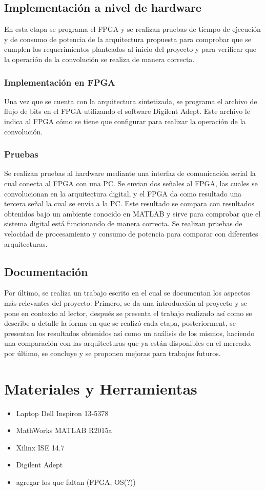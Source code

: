 \subsection{Implementación a nivel de hardware}
En esta etapa se programa el FPGA y se realizan pruebas de tiempo de ejecución y de consumo de potencia de la arquitectura propuesta para comprobar que se cumplen los requerimientos planteados al inicio del proyecto y para verificar que la operación de la convolución se realiza de manera correcta. 

\subsubsection{Implementación en FPGA}
Una vez que se cuenta con la arquitectura sintetizada, se programa el archivo de flujo de bits en el FPGA utilizando el software Digilent Adept. Este archivo le indica al FPGA cómo se tiene que configurar para realizar la operación de la convolución.

\subsubsection{Pruebas}
Se realizan pruebas al hardware mediante una interfaz de comunicación serial la cual conecta al FPGA con una PC. Se envian dos señales al FPGA, las cuales se convolucionan en la arquitectura digital, y el FPGA da como resultado una tercera señal la cual se envía a la PC. Este resultado se compara con resultados obtenidos bajo un ambiente conocido en MATLAB y sirve para comprobar que el sistema digital está funcionando de manera correcta. Se realizan pruebas de velocidad de procesamiento y consumo de potencia para comparar con diferentes arquitecturas.

\subsection{Documentación}
Por último, se realiza un trabajo escrito en el cual se documentan los aspectos más relevantes del proyecto. Primero, se da una introducción al proyecto y se pone en contexto al lector, después se presenta el trabajo realizado así como se describe a detalle la forma en que se realizó cada etapa, posteriorment, se presentan los resultados obtenidos así como un análisis de los mismos, haciendo una comparación con las arquitecturas que ya están disponibles en el mercado, por último, se concluye y se proponen mejoras para trabajos futuros. 

\section{Materiales y Herramientas}
\begin{itemize}
\item Laptop Dell Inspiron 13-5378
\item MathWorks MATLAB R2015a
\item Xilinx ISE 14.7
\item Digilent Adept
\color{red}
\item agregar los que faltan (FPGA, OS(?))
\end{itemize}
